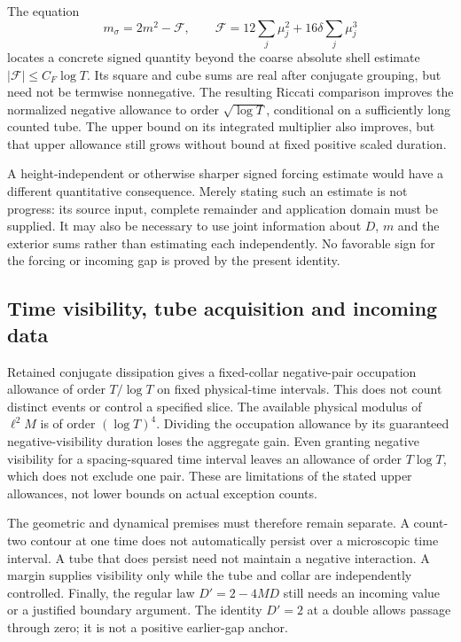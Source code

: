 The equation
\[
 m_\sigma=2m^2-\mathcal F,\qquad
 \mathcal F=12\sum_j\mu_j^2+16\delta\sum_j\mu_j^3
\]
locates a concrete signed quantity beyond the coarse absolute shell
estimate \(|\mathcal F|\le C_F\log T\). Its square and cube sums are
real after conjugate grouping, but need not be termwise nonnegative.
The resulting Riccati comparison improves the normalized negative
allowance to order \(\sqrt{\log T}\), conditional on a sufficiently
long counted tube. The upper bound on its integrated multiplier also
improves, but that upper allowance still grows without bound at fixed
positive scaled duration.

A height-independent or otherwise sharper signed forcing estimate would
have a different quantitative consequence. Merely stating such an
estimate is not progress: its source input, complete remainder and
application domain must be supplied. It may also be necessary to use
joint information about \(D\), \(m\) and the exterior sums rather than
estimating each independently. No favorable sign for the forcing or
incoming gap is proved by the present identity.

\subsection{Time visibility, tube acquisition and incoming data}

Retained conjugate dissipation gives a fixed-collar negative-pair
occupation allowance of order \(T/\log T\) on fixed physical-time
intervals. This does not count distinct events or control a specified
slice. The available physical modulus of \(\ell^2M\) is of order
\((\log T)^4\). Dividing the occupation allowance by its guaranteed
negative-visibility duration loses the aggregate gain. Even granting
negative visibility for a spacing-squared time interval leaves an
allowance of order \(T\log T\), which does not exclude one pair.
These are limitations of the stated upper allowances, not lower bounds
on actual exception counts.

The geometric and dynamical premises must therefore remain separate.
A count-two contour at one time does not automatically persist over a
microscopic time interval. A tube that does persist need not maintain a
negative interaction. A margin supplies visibility only while the tube
and collar are independently controlled. Finally, the regular law
\(D'=2-4MD\) still needs an incoming value or a justified boundary
argument. The identity \(D'=2\) at a double allows passage through zero;
it is not a positive earlier-gap anchor.

